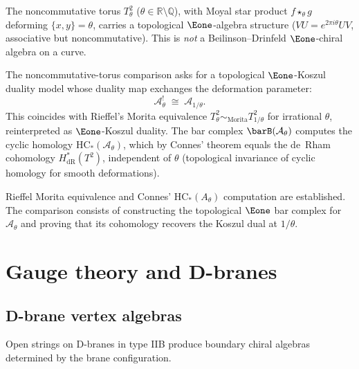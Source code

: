 \begin{construction}
The noncommutative torus $T^2_\theta$ ($\theta \in \mathbb{R} \setminus \mathbb{Q}$), with Moyal star product $f \star_\theta g$ deforming $\{x,y\}=\theta$, carries a topological $\Eone$-algebra structure ($VU = e^{2\pi i\theta}UV$, associative but noncommutative). This is \emph{not} a Beilinson--Drinfeld $\Eone$-chiral algebra on a curve.
\end{construction}

\begin{remark}
The noncommutative-torus comparison asks for a topological
$\Eone$-Koszul duality model whose duality map exchanges the deformation
parameter:
\[
\mathcal{A}_\theta^! \;\cong\; \mathcal{A}_{1/\theta}.
\]
This coincides with Rieffel's Morita equivalence $T^2_\theta \sim_{\mathrm{Morita}} T^2_{1/\theta}$
for irrational $\theta$, reinterpreted as $\Eone$-Koszul duality.
The bar complex $\barB(\mathcal{A}_\theta)$ computes the cyclic homology
$\mathrm{HC}_*(\mathcal{A}_\theta)$, which by Connes' theorem equals the de~Rham
cohomology $H^*_{\mathrm{dR}}(T^2)$, independent of $\theta$ (topological invariance
of cyclic homology for smooth deformations).
\end{remark}

\begin{remark}
Rieffel Morita equivalence and Connes' $\mathrm{HC}_*(A_\theta)$ computation are established. The comparison consists of constructing the topological $\Eone$ bar complex for $\mathcal{A}_\theta$ and proving that its cohomology recovers the Koszul dual at $1/\theta$.
\end{remark}


\section{Gauge theory and D-branes}
\subsection{D-brane vertex algebras}

\begin{construction}
Open strings on D-branes in type IIB produce boundary chiral algebras determined by the brane configuration.
\end{construction}

